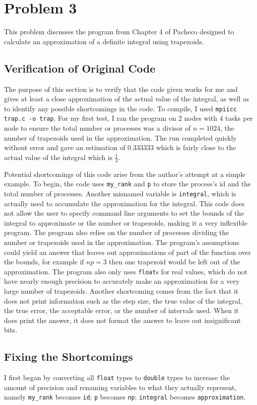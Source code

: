\documentclass[11pt]{article}
\begin{document}
\section{Problem 3}
This problem discusses the program from Chapter 4 of Pacheco designed to calculate an approximation of a definite integral using trapezoids.
\subsection{Verification of Original Code}
The purpose of this section is to verify that the code given works for me and gives at least a close approximation of the actual value of the integral, as well as to identify any possible shortcomings in the code. To compile, I used \texttt{mpiicc trap.c -o trap}. For my first test, I ran the program on $2$ nodes with $4$ tasks per node to ensure the total number or processes was a divisor of $n=1024$, the number of trapezoids used in the approximation. The run completed quickly without error and gave an estimation of 0.333333 which is fairly close to the actual value of the integral which is $\frac{1}{3}$.

Potential shortcomings of this code arise from the author's attempt at a simple example. To begin, the code uses \texttt{my\_rank} and \texttt{p} to store the process's id and the total number of processes. Another misnamed variable is \texttt{integral}, which is actually used to accumulate the approximation for the integral. This code does not allow the user to specify command line arguments to set the bounds of the integral to approximate or the number or trapezoids, making it a very inflexible program. The program also relies on the number of processes dividing the number or trapezoids used in the approximation. The program's assumptions could yield an answer that leaves out approximations of part of the function over the bounds, for example if $np=3$ then one trapezoid would be left out of the approximation. The program also only uses \texttt{float}s for real values, which do not have nearly enough precision to accurately make an approximation for a very large number of trapezoids. Another shortcoming comes from the fact that it does not print information such as the step size, the true value of the integral, the true error, the acceptable error, or the number of intervals used. When it does print the answer, it does not format the answer to leave out insignificant bits.

\subsection{Fixing the Shortcomings}
I first began by converting all \texttt{float} types to \texttt{double} types to increase the amount of precision and renaming variables to what they actually represent, namely \texttt{my\_rank} becomes \texttt{id}; \texttt{p} becomes \texttt{np}; \texttt{integral} becomes \texttt{approximation}.
\end{document}
